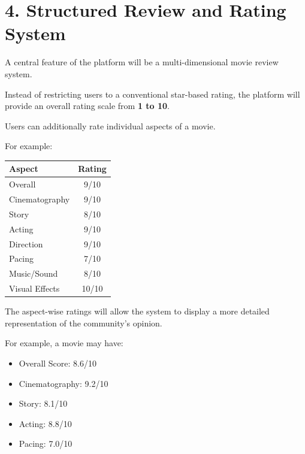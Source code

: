\documentclass[11pt,a4paper]{article}
\begin{document}

\section{4. Structured Review and Rating System}

A central feature of the platform will be a multi-dimensional movie review system.

Instead of restricting users to a conventional star-based rating, the platform will provide an overall rating scale from \textbf{1 to 10}.

Users can additionally rate individual aspects of a movie.

For example:

\begin{center}

\begin{tabular}{|p{4.5cm}|c|}
\hline
\textbf{Aspect} & \textbf{Rating} \\
\hline
Overall & 9/10 \\
Cinematography & 9/10 \\
Story & 8/10 \\
Acting & 9/10 \\
Direction & 9/10 \\
Pacing & 7/10 \\
Music/Sound & 8/10 \\
Visual Effects & 10/10 \\
\hline

\end{tabular}

\end{center}

The aspect-wise ratings will allow the system to display a more detailed representation of the community's opinion.

For example, a movie may have:

\begin{itemize}

    \item Overall Score: 8.6/10
    \item Cinematography: 9.2/10
    \item Story: 8.1/10
    \item Acting: 8.8/10
    \item Pacing: 7.0/10

\end{itemize}
\end{document}
